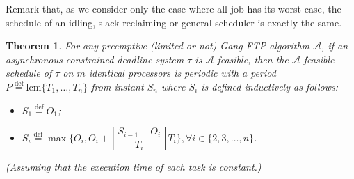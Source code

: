 \documentclass[a4paper]{article}
\newtheorem{theorem}{Theorem}
\newcommand{\equals}{\stackrel{\mathrm{def}}{=}}
\newcommand{\lcm}{\mathrm{lcm}}
\begin{document}
Remark that, as we consider only the case where all job has its worst case, the schedule of an idling, slack reclaiming or general scheduler is exactly the same.

\begin{theorem}\label{thm:asynPer} For any preemptive (limited or not) Gang FTP algorithm $\mathcal{A}$, if an asynchronous constrained deadline system $\tau$ is $\mathcal{A}$-feasible, then the $\mathcal{A}$-feasible schedule of $\tau$ on $m$ identical processors is periodic with a period $P \equals \lcm\{T_{1}, \ldots, T_{n}\}$ from instant $S_n$ where $S_i$ is defined inductively as follows:

  \begin{itemize}
  \item $S_1 \equals O_1$; 
  \item $S_i \equals \max \{ O_i, O_i+ \left\lceil \dfrac{S_{i-1}-O_i}{T_i}
    \right\rceil T_i \}, \forall i \in \{2,3, \ldots, n \}$.
  \end{itemize}
  
  (Assuming that the execution time of each task is constant.)
\end{theorem}
\end{document}
